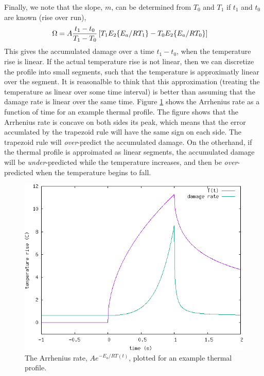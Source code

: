 \documentclass{article}
\begin{document}
Finally, we note that the slope, $m$, can be determined from $T_0$ and $T_1$ if $t_1$ and $t_0$ are known (rise over run),
\begin{align}
  \Omega &= A \frac{t_1 - t_0}{T_1 - T_0}              \left[T_1 E_2\qty{E_a/RT_1}              - T_0 E_2\qty{E_a/RT_0}             \right]
\end{align}
This gives the accumulated damage over a time $t_1 - t_0$, when the temperature rise is linear. If the actual
temperature rise is not linear, then we can discretize the profile into small segments, such that
the temperature is approximatly linear over the segment. It is reasonalble to think that this approximation
(treating the temperature as linear over some time interval) is better than assuming that the damage rate
is linear over the same time. Figure \ref{fig:arrhenius_rate} shows the Arrhenius rate as a function of time for an example
thermal profile. The figure shows that the Arrhenius rate is concave on both sides its peak, which means that the error accumlated by the
trapezoid rule will have the same sign on each side. The trapezoid rule will \emph{over}-predict the accumulated damage. On the otherhand,
if the thermal profile is approimated as linear segments, the accumulated damage will be \emph{under}-predicted while the temperature increases, and
then be \emph{over}-predicted when the temperature begins to fall.


\begin{figure}
\includegraphics{./arrhenius_rate.png}
\caption{\label{fig:arrhenius_rate} The Arrhenius rate, $Ae^{-E_a/RT(t)}$, plotted for an example thermal profile. }
\end{figure}




\end{document}
